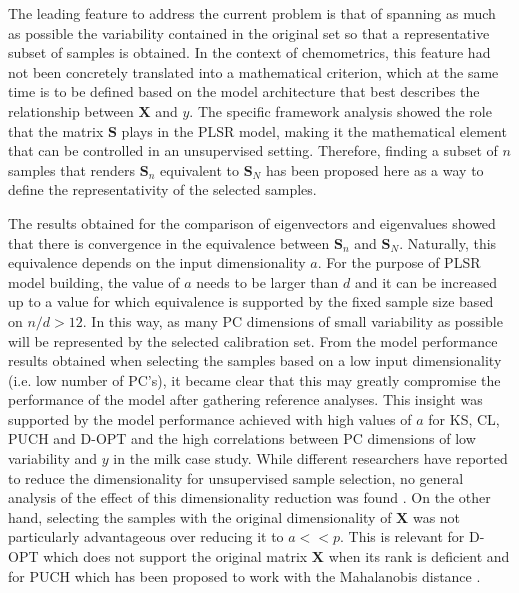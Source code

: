 \documentclass[preprint,12pt]{elsarticle}
\begin{document}
The leading feature to address the current problem is that of spanning as much as possible the variability contained in the original set so that a representative subset of samples is obtained. In the context of chemometrics, this feature had not been concretely translated into a mathematical criterion, which at the same time is to be defined based on the model architecture that best describes the relationship between $\mathbf{X}$ and $y$. The specific framework analysis showed the role that the matrix $\mathbf{S}$ plays in the PLSR model, making it the mathematical element that can be controlled in an unsupervised setting. Therefore, finding a subset of $n$ samples that renders $\mathbf{S}_n$ equivalent to $\mathbf{S}_N$ has been proposed here as a way to define the representativity of the selected samples. 

The results obtained for the comparison of eigenvectors and eigenvalues showed that there is convergence in the equivalence between $\mathbf{S}_n$ and $\mathbf{S}_N$. Naturally, this equivalence depends on the input dimensionality $a$. For the purpose of PLSR model building, the value of $a$ needs to be larger than $d$ and it can be increased up to a value for which equivalence is supported by the fixed sample size based on $n/d>12$. In this way, as many PC dimensions of small variability as possible will be represented by the selected calibration set. From the model performance results obtained when selecting the samples based on a low input dimensionality (i.e. low number of PC's), it became clear that this may greatly compromise the performance of the model after gathering reference analyses. This insight was supported by the model performance achieved with high values of $a$ for KS, CL, PUCH and D-OPT and the high correlations between PC dimensions of low variability and $y$ in the milk case study. While different researchers have reported to reduce the dimensionality for unsupervised sample selection, no general analysis of the effect of this dimensionality reduction was found \cite{Naes1990, Brandmaier2012, Nawar2018, Au2020}. On the other hand, selecting the samples with the original dimensionality of $\mathbf{X}$ was not particularly advantageous over reducing it to $a<<p$. This is relevant for D-OPT which does not support the original matrix $\mathbf{X}$ when its rank is deficient and for PUCH which has been proposed to work with the Mahalanobis distance \cite{Puchwein1988}.
\end{document}
